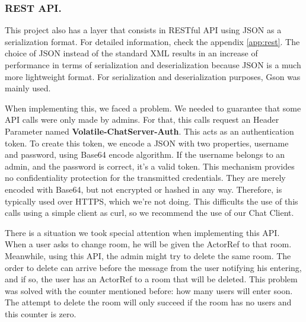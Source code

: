 \subsubsection{REST API.}
This project also has a layer that consists in RESTful API using JSON as a serialization format. For detailed information, check the appendix \ref{app:rest}.
The choice of JSON instead of the standard XML results in an increase of performance in terms of serialization and deserialization because JSON is a much more lightweight format. For serialization and deserialization purposes, Gson was mainly used.

When implementing this, we faced a problem. We needed to guarantee that some API calls were only made by admins. For that, this calls request an Header Parameter named \textbf{Volatile-ChatServer-Auth}. This acts as an authentication token. To create this token, we encode a JSON with two properties, username and password, using Base64 encode algorithm. If the username belongs to an admin, and the password is correct, it's a valid token. This mechanism provides no confidentiality protection for the transmitted credentials. They are merely encoded with Base64, but not encrypted or hashed in any way. Therefore, is typically used over HTTPS, which we're not doing. This difficults the use of this calls using a simple client as curl, so we recommend the use of our Chat Client.

There is a situation we took special attention when implementing this API. When a user asks to change room, he will be given the ActorRef to that room. 
Meanwhile, using this API, the admin might try to delete the same room.
The order to delete can arrive before the message from the user notifying his entering, and if so, the user has an ActorRef to a room that will be deleted. This problem was solved with the counter mentioned before: how many users will enter soon. The attempt to delete the room will only succeed if the room has no users and this counter is zero.
